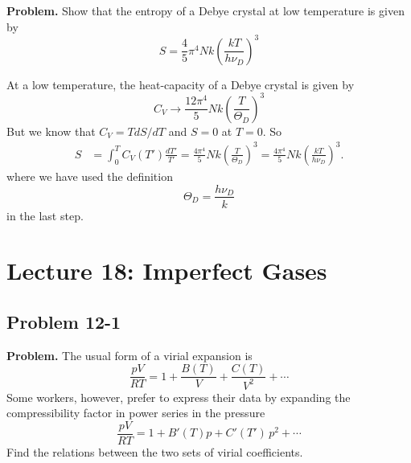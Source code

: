\documentclass[twocolumn, 10pt]{article}
\numberwithin{equation}{section}
\newenvironment{problem}
{\par\medskip \color{problue}
  \textbf{Problem. }\ignorespaces}
{\medskip}
\newenvironment{solution}[1][\empty]
{\par\medskip\sffamily
  \textbf{\ifx\empty#1{Solution.}\relax\else{#1}\fi} \ignorespaces}
{\medskip}
\begin{document}
\begin{problem}
  Show that the entropy of a Debye crystal at low
  temperature is given by
  $$
  S = \frac{4}{5} \pi^4 N k \left(\frac{kT}{h\nu_D}\right)^3
  $$
\end{problem}

\begin{solution}
  At a low temperature,
  the heat-capacity of a Debye crystal is given by
  \begin{equation}
    C_V \to \frac{ 12 \pi^4} { 5}
    N k \left( \frac{ T } { \Theta_D } \right)^3
    \tag{11-31}
  \end{equation}
  But we know that $C_V = TdS/dT$ and $S = 0$ at $T = 0$.
  So
  \begin{align*}
    S &= \int_0^T C_V(T') \frac{dT'}{T'}
    =
    \frac{ 4 \pi^4}{5}
    N k \left( \frac{T}{\Theta_D} \right)^3
    =
    \frac{ 4 \pi^4}{5}
    N k \left( \frac{k T}{h \nu_D} \right)^3
    .
  \end{align*}
  where we have used the definition
  \begin{equation}
    \Theta_D = \frac{ h \nu_D } { k}
    \tag{11-27}
  \end{equation}
  in the last step.
\end{solution}

\section{Lecture 18: Imperfect Gases}

\subsection{Problem 12-1}

\begin{problem}
  The usual form of a virial expansion is
  \begin{equation}
    \frac{pV}{RT}
    =
    1 + \frac{B(T)} {V} + \frac{C(T)}{V^2} + \cdots
    \label{eq:vir_invV}
  \end{equation}
  Some workers, however, prefer to express their data
  by expanding the compressibility factor
  in power series in the pressure
  $$
  \frac{ pV}{RT}
  =
  1+ B'(T) p + C'(T') \, p^2 + \cdots
  $$
  Find the relations between the two sets of virial coefficients.
\end{problem}
\end{document}
